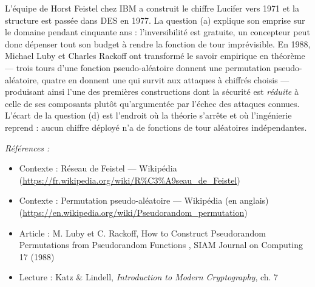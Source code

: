 \documentclass[11pt]{article}
\newenvironment{refs}{\par\small\noindent\emph{Références :}\begin{itemize}\setlength\itemsep{0pt}}{\end{itemize}\normalsize}
\begin{document}
\noindent L'équipe de Horst Feistel chez IBM a construit le chiffre Lucifer vers 1971
et la structure est passée dans DES en 1977. La question (a) explique son emprise sur le
domaine pendant cinquante ans : l'inversibilité est gratuite, un concepteur peut donc dépenser
tout son budget à rendre la fonction de tour imprévisible. En 1988, Michael Luby et Charles
Rackoff ont transformé le savoir empirique en théorème --- trois tours d'une fonction
pseudo-aléatoire donnent une permutation pseudo-aléatoire, quatre en donnent une qui survit
aux attaques à chiffrés choisis --- produisant ainsi l'une des premières constructions dont la
sécurité est \textit{réduite} à celle de ses composants plutôt qu'argumentée par l'échec des
attaques connues. L'écart de la question (d) est l'endroit où la théorie s'arrête et où
l'ingénierie reprend : aucun chiffre déployé n'a de fonctions de tour aléatoires
indépendantes.

\begin{refs}
\item Contexte : Réseau de Feistel --- Wikipédia (\url{https://fr.wikipedia.org/wiki/R%C3%A9seau_de_Feistel})
\item Contexte : Permutation pseudo-aléatoire --- Wikipédia (en anglais) (\url{https://en.wikipedia.org/wiki/Pseudorandom_permutation})
\item Article : M. Luby et C. Rackoff, \og{} How to Construct Pseudorandom Permutations from Pseudorandom Functions \fg{}, SIAM Journal on Computing 17 (1988)
\item Lecture : Katz \& Lindell, \textit{Introduction to Modern Cryptography}, ch. 7
\end{refs}

\bigskip
\end{document}
